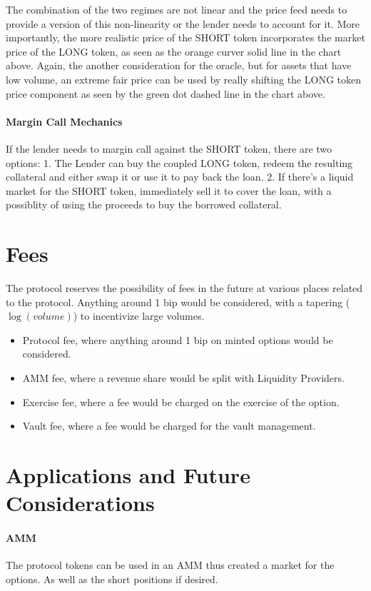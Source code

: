 The combination of the two regimes are not linear and the price feed needs to provide a version of this non-linearity or the lender needs to account for it.
More importantly, the more realistic price of the SHORT token incorporates the market price of the LONG token, as seen as the orange curver solid line in the chart above.
Again, the another consideration for the oracle, but for assets that have low volume, an extreme fair price can be used by really shifting the LONG token price component as seen by the green dot dashed line in the chart above.

\paragraph*{Margin Call Mechanics}
If the lender needs to margin call against the SHORT token, there are two options: 1. The Lender can buy the coupled LONG token, redeem the resulting collateral and either swap it or use it to pay back the loan. 2. If there's a liquid market for the SHORT token, immediately sell it to cover the loan, with a possiblity of using the proceeds to buy the borrowed collateral.

\section{Fees}
The protocol reserves the possibility of fees in the future at various places related to the protocol.
Anything around 1 bip would be considered, with a tapering ($\log(volume)$) to incentivize large volumes.
\begin{itemize}
  \setlength{\itemsep}{0pt}
  \setlength{\parskip}{0pt}
  \item Protocol fee, where anything around 1 bip on minted options would be considered.
  \item AMM fee, where a revenue share would be split with Liquidity Providers.
  \item Exercise fee, where a fee would be charged on the exercise of the option.
  \item Vault fee, where a fee would be charged for the vault management.
\end{itemize}


\section{Applications and Future Considerations}
\paragraph*{AMM}
The protocol tokens can be used in an AMM thus created a market for the options. As well as the short positions if desired. 

